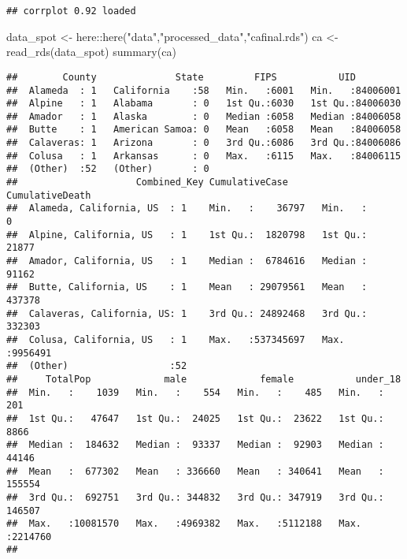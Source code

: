 \documentclass[
]{article}
\newenvironment{Shaded}{\begin{snugshade}}{\end{snugshade}}
\newcommand{\FunctionTok}[1]{\textcolor[rgb]{0.00,0.00,0.00}{#1}}
\newcommand{\NormalTok}[1]{#1}
\newcommand{\OtherTok}[1]{\textcolor[rgb]{0.56,0.35,0.01}{#1}}
\newcommand{\SpecialCharTok}[1]{\textcolor[rgb]{0.00,0.00,0.00}{#1}}
\newcommand{\StringTok}[1]{\textcolor[rgb]{0.31,0.60,0.02}{#1}}
\begin{document}
\begin{verbatim}
## corrplot 0.92 loaded
\end{verbatim}

\begin{Shaded}
\begin{Highlighting}[]
\NormalTok{data\_spot }\OtherTok{\textless{}{-}}\NormalTok{ here}\SpecialCharTok{::}\FunctionTok{here}\NormalTok{(}\StringTok{"data"}\NormalTok{,}\StringTok{"processed\_data"}\NormalTok{,}\StringTok{"cafinal.rds"}\NormalTok{) }
\NormalTok{ca }\OtherTok{\textless{}{-}} \FunctionTok{read\_rds}\NormalTok{(data\_spot)}
\FunctionTok{summary}\NormalTok{(ca)}
\end{Highlighting}
\end{Shaded}

\begin{verbatim}
##        County              State         FIPS           UID          
##  Alameda  : 1   California    :58   Min.   :6001   Min.   :84006001  
##  Alpine   : 1   Alabama       : 0   1st Qu.:6030   1st Qu.:84006030  
##  Amador   : 1   Alaska        : 0   Median :6058   Median :84006058  
##  Butte    : 1   American Samoa: 0   Mean   :6058   Mean   :84006058  
##  Calaveras: 1   Arizona       : 0   3rd Qu.:6086   3rd Qu.:84006086  
##  Colusa   : 1   Arkansas      : 0   Max.   :6115   Max.   :84006115  
##  (Other)  :52   (Other)       : 0                                    
##                     Combined_Key CumulativeCase      CumulativeDeath  
##  Alameda, California, US  : 1    Min.   :    36797   Min.   :      0  
##  Alpine, California, US   : 1    1st Qu.:  1820798   1st Qu.:  21877  
##  Amador, California, US   : 1    Median :  6784616   Median :  91162  
##  Butte, California, US    : 1    Mean   : 29079561   Mean   : 437378  
##  Calaveras, California, US: 1    3rd Qu.: 24892468   3rd Qu.: 332303  
##  Colusa, California, US   : 1    Max.   :537345697   Max.   :9956491  
##  (Other)                  :52                                         
##     TotalPop             male             female           under_18      
##  Min.   :    1039   Min.   :    554   Min.   :    485   Min.   :    201  
##  1st Qu.:   47647   1st Qu.:  24025   1st Qu.:  23622   1st Qu.:   8866  
##  Median :  184632   Median :  93337   Median :  92903   Median :  44146  
##  Mean   :  677302   Mean   : 336660   Mean   : 340641   Mean   : 155554  
##  3rd Qu.:  692751   3rd Qu.: 344832   3rd Qu.: 347919   3rd Qu.: 146507  
##  Max.   :10081570   Max.   :4969382   Max.   :5112188   Max.   :2214760  
##                                                                          

\end{verbatim}
\end{document}
